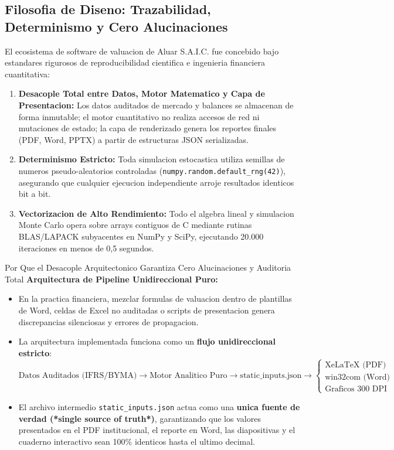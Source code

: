 \documentclass[10pt,a4paper]{article}
\theoremstyle{definition}
\begin{document}
\subsection{Filosofia de Diseno: Trazabilidad, Determinismo y Cero Alucinaciones}
El ecosistema de software de valuacion de Aluar S.A.I.C. fue concebido bajo estandares rigurosos de reproducibilidad cientifica e ingenieria financiera cuantitativa:
\begin{enumerate}
    \item \textbf{Desacople Total entre Datos, Motor Matematico y Capa de Presentacion:} Los datos auditados de mercado y balances se almacenan de forma inmutable; el motor cuantitativo no realiza accesos de red ni mutaciones de estado; la capa de renderizado genera los reportes finales (PDF, Word, PPTX) a partir de estructuras JSON serializadas.
    \item \textbf{Determinismo Estricto:} Toda simulacion estocastica utiliza semillas de numeros pseudo-aleatorios controladas (\texttt{numpy.random.default\_rng(42)}), asegurando que cualquier ejecucion independiente arroje resultados identicos bit a bit.
    \item \textbf{Vectorizacion de Alto Rendimiento:} Todo el algebra lineal y simulacion Monte Carlo opera sobre arrays contiguos de C mediante rutinas BLAS/LAPACK subyacentes en NumPy y SciPy, ejecutando 20.000 iteraciones en menos de 0,5 segundos.
\end{enumerate}

\begin{conceptbox}{Por Que el Desacople Arquitectonico Garantiza Cero Alucinaciones y Auditoria Total}
\textbf{Arquitectura de Pipeline Unidireccional Puro:}
\begin{itemize}
    \item En la practica financiera, mezclar formulas de valuacion dentro de plantillas de Word, celdas de Excel no auditadas o scripts de presentacion genera discrepancias silenciosas y errores de propagacion.
    \item La arquitectura implementada funciona como un \textbf{flujo unidireccional estricto}:
    \begin{equation}
    \text{Datos Auditados (IFRS/BYMA)} \longrightarrow \text{Motor Analitico Puro} \longrightarrow \text{static\_inputs.json} \longrightarrow \begin{cases} \text{XeLaTeX (PDF)} \\ \text{win32com (Word)} \\ \text{Graficos 300 DPI} \end{cases}
    \end{equation}
    \item El archivo intermedio \texttt{static\_inputs.json} actua como una \textbf{unica fuente de verdad (*single source of truth*)}, garantizando que los valores presentados en el PDF institucional, el reporte en Word, las diapositivas y el cuaderno interactivo sean 100\% identicos hasta el ultimo decimal.
\end{itemize}
\end{conceptbox}
\end{document}

